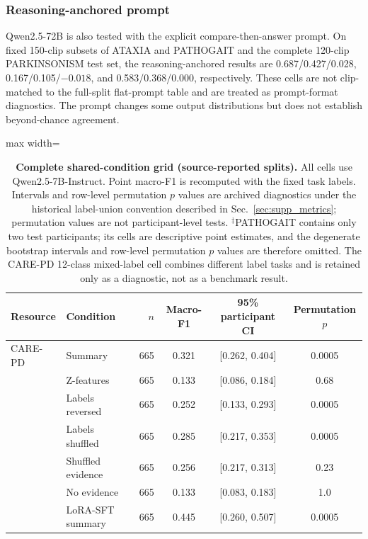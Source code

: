 \subsubsection{Reasoning-anchored prompt}

Qwen2.5-72B is also tested with the explicit compare-then-answer prompt. On fixed 150-clip subsets of ATAXIA and PATHOGAIT and the complete 120-clip PARKINSONISM test set, the reasoning-anchored results are 0.687/0.427/0.028, 0.167/0.105/$-0.018$, and 0.583/0.368/0.000, respectively. These cells are not clip-matched to the full-split flat-prompt table and are treated as prompt-format diagnostics. The prompt changes some output distributions but does not establish beyond-chance agreement.

\begin{table}[H]
\centering
\caption{\textbf{Complete shared-condition grid (source-reported splits).}
All cells use Qwen2.5-7B-Instruct. Point macro-F1 is recomputed with the fixed task labels. Intervals and row-level permutation $p$ values are archived diagnostics under the historical label-union convention described in Sec.~\ref{sec:supp_metrics}; permutation values are not participant-level tests.
$^{\ddagger}$PATHOGAIT contains only two test participants; its cells
are descriptive point estimates, and the degenerate bootstrap
intervals and row-level permutation $p$ values are therefore omitted.
The CARE-PD 12-class mixed-label cell combines different label tasks
and is retained only as a diagnostic, not as a benchmark result.}
\label{tab:standardized_full_grid}
\scriptsize
\setlength{\tabcolsep}{3pt}
\begin{adjustbox}{max width=\textwidth}
\begin{tabular}{llrccc}
\toprule
Resource & Condition & $n$ & Macro-F1 & 95\% participant CI & Permutation $p$ \\
\midrule
CARE-PD & Summary & 665 & 0.321 & [0.262, 0.404] & 0.0005 \\
& Z-features & 665 & 0.133 & [0.086, 0.184] & 0.68 \\
& Labels reversed & 665 & 0.252 & [0.133, 0.293] & 0.0005 \\
& Labels shuffled & 665 & 0.285 & [0.217, 0.353] & 0.0005 \\
& Shuffled evidence & 665 & 0.256 & [0.217, 0.313] & 0.23 \\
& No evidence & 665 & 0.133 & [0.083, 0.183] & 1.0 \\
& LoRA-SFT summary & 665 & 0.445 & [0.260, 0.507] & 0.0005 \\

\end{tabular}
\end{adjustbox}
\end{table}
